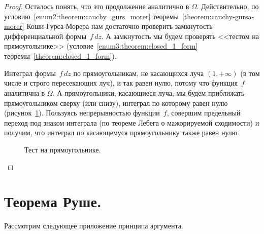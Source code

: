 \documentclass[../complex-analysis.tex]{subfiles}
\begin{document}
\begin{proof}
 Осталось понять, что это продолжение аналитично в $ \Omega $. Действительно, по условию~\ref{enum2:theorem:cauchy_gurs_morer} теоремы~\ref{theorem:cauchy-gursa-morer} Коши-Гурса-Морера нам достаточно проверить замкнутость дифференциальной формы~$ f\,dz $. А замкнутость мы будем проверять <<тестом на прямоугольнике>> (условие~\ref{enum3:theorem:closed_1_form} теоремы~\ref{theorem:closed_1_form}).

 Интеграл формы~$ f\,dz $ по прямоугольникам, не касающихся луча $ (1,+\infty) $ (в том числе и строго пересекающих луч), и так равен нулю, потому что функция~$ f $ аналитична в $ \tilde\Omega $. А прямоугольники, касающиеся луча, мы будем приближать прямоугольником сверху (или снизу), интеграл по которому равен нулю (рисунок~\ref{fig:rectangle_test_example_analytic_square}). Пользуясь непрерывностью функции~$ f $, совершим предельный переход под знаком интеграла (по теореме Лебега о мажорируемой сходимости) и получим, что интеграл по касающемуся прямоугольнику также равен нулю.

 \begin{figure}[ht]
  \centering
  \caption{Тест на прямоугольнике.}
  \label{fig:rectangle_test_example_analytic_square}
 \end{figure}
\end{proof}

\newpage
\section{Теорема Руше.}

Рассмотрим следующее приложение принципа аргумента.
\end{document}
